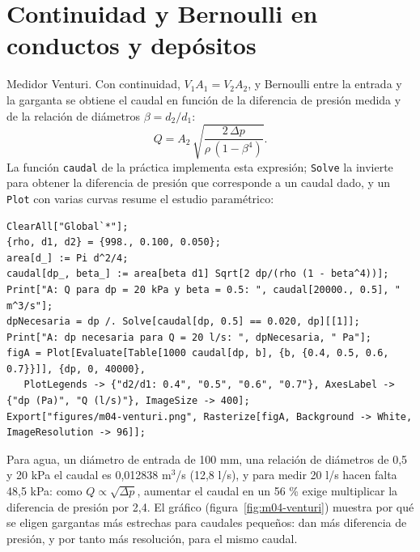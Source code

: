 \documentclass[10pt,openany]{book}
\begin{document}

\section{Continuidad y Bernoulli en conductos y depósitos}

Medidor Venturi. Con continuidad, \(V_1 A_1 = V_2 A_2\), y Bernoulli entre la entrada y la garganta se obtiene el caudal en función de la diferencia de presión medida y de la relación de diámetros \(\beta = d_2/d_1\):
\begin{equation}
Q = A_2\,\sqrt{\frac{2\,\Delta p}{\rho\,(1 - \beta^{4})}}. \label{eq:m04-venturi}
\end{equation}
La función \texttt{caudal} de la práctica implementa esta expresión; \texttt{Solve} la invierte para obtener la diferencia de presión que corresponde a un caudal dado, y un \texttt{Plot} con varias curvas resume el estudio paramétrico:
\begin{lstlisting}[style=studium]
ClearAll["Global`*"];
{rho, d1, d2} = {998., 0.100, 0.050};
area[d_] := Pi d^2/4;
caudal[dp_, beta_] := area[beta d1] Sqrt[2 dp/(rho (1 - beta^4))];
Print["A: Q para dp = 20 kPa y beta = 0.5: ", caudal[20000., 0.5], " m^3/s"];
dpNecesaria = dp /. Solve[caudal[dp, 0.5] == 0.020, dp][[1]];
Print["A: dp necesaria para Q = 20 l/s: ", dpNecesaria, " Pa"];
figA = Plot[Evaluate[Table[1000 caudal[dp, b], {b, {0.4, 0.5, 0.6, 0.7}}]], {dp, 0, 40000},
   PlotLegends -> {"d2/d1: 0.4", "0.5", "0.6", "0.7"}, AxesLabel -> {"dp (Pa)", "Q (l/s)"}, ImageSize -> 400];
Export["figures/m04-venturi.png", Rasterize[figA, Background -> White, ImageResolution -> 96]];
\end{lstlisting}
Para agua, un diámetro de entrada de 100 mm, una relación de diámetros de 0,5 y 20 kPa el caudal es 0,012838 m\(^3\)/s (12,8 l/s), y para medir 20 l/s hacen falta 48,5 kPa: como \(Q \propto \sqrt{\Delta p}\), aumentar el caudal en un 56 \% exige multiplicar la diferencia de presión por 2,4. El gráfico (figura~\ref{fig:m04-venturi}) muestra por qué se eligen gargantas más estrechas para caudales pequeños: dan más diferencia de presión, y por tanto más resolución, para el mismo caudal.
\end{document}
